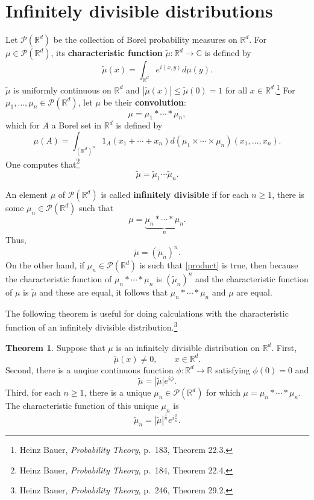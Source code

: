 \documentclass{article}
\newcommand{\inner}[2]{\left\langle #1, #2 \right\rangle}
\theoremstyle{definition}
\newtheorem{theorem}{Theorem}
\theoremstyle{definition}
\begin{document}
\section{Infinitely divisible distributions}
Let $\mathscr{P}(\mathbb{R}^d)$ be the collection of Borel probability measures on $\mathbb{R}^d$. 
For $\mu \in \mathscr{P}(\mathbb{R}^d)$, its \textbf{characteristic function} $\tilde{\mu}:\mathbb{R}^d \to \mathbb{C}$
is defined
by
\[
\tilde{\mu}(x) = \int_{\mathbb{R}^d} e^{i\inner{x}{y}} d\mu(y).
\]
$\tilde{\mu}$ is uniformly continuous on $\mathbb{R}^d$ and $|\tilde{\mu}(x)| \leq \tilde{\mu}(0)=1$ for all
$x \in \mathbb{R}^d$.\footnote{Heinz Bauer, {\em Probability Theory}, p.~183, Theorem 22.3.}
For $\mu_1,\ldots,\mu_n \in \mathscr{P}(\mathbb{R}^d)$, let $\mu$ be their \textbf{convolution}:
\[
\mu = \mu_1* \cdots * \mu_n,
\]
which for $A$ a Borel set in $\mathbb{R}^d$ is defined by
\[
\mu(A) = \int_{(\mathbb{R}^d)^n} 1_A(x_1+\cdots+x_n) d(\mu_1 \times \cdots
\times \mu_n)(x_1,\ldots,x_n).
\]
One computes that\footnote{Heinz Bauer, {\em Probability Theory}, p.~184, Theorem 22.4.}
\[
\tilde{\mu} = \tilde{\mu}_1 \cdots \tilde{\mu}_n.
\]

An element $\mu$ of $\mathscr{P}(\mathbb{R}^d)$ is called \textbf{infinitely divisible} if
for each $n \geq 1$, there is some $\mu_n \in \mathscr{P}(\mathbb{R}^d)$ such that
\begin{equation}
\mu = \underbrace{\mu_n * \cdots * \mu_n}_{n}.
\label{convolution}
\end{equation}
Thus,
\begin{equation}
\tilde{\mu} = (\tilde{\mu}_n)^n.
\label{product}
\end{equation}
On the other hand, if $\mu_n \in \mathscr{P}(\mathbb{R}^d)$ is such that
\eqref{product} is true, then
because the characteristic function of $\mu_n*\cdots*\mu_n$ is 
$(\tilde{\mu}_n)^n$ and the characteristic function of $\mu$ is $\tilde{\mu}$ and these are equal,
it follows that $\mu_n*\cdots*\mu_n$ and $\mu$ are equal. 

The following theorem is useful for doing calculations with the characteristic function of an infinitely
divisible distribution.\footnote{Heinz Bauer, {\em Probability Theory},
p.~246, Theorem 29.2.}

\begin{theorem}
Suppose that $\mu$ is an infinitely divisible distribution on $\mathbb{R}^d$. First,
\[
\tilde{\mu}(x) \neq 0, \qquad x \in \mathbb{R}^d.
\]
Second, there is a unqiue continuous function $\phi:\mathbb{R}^d \to \mathbb{R}$ satisfying
$\phi(0)=0$ and
\[
\tilde{\mu} = |\tilde{\mu}| e^{i\phi}.
\]
Third, for each $n \geq 1$, there is a unique $\mu_n \in \mathscr{P}(\mathbb{R}^d)$ for which
$\mu = \mu_n * \cdots * \mu_n$. The characteristic function of this unique $\mu_n$ is
\[
\tilde{\mu}_n = |\tilde{\mu}|^{\frac{1}{n}} e^{i\frac{\phi}{n}}.
\]
\label{nonzero}
\end{theorem}
\end{document}
